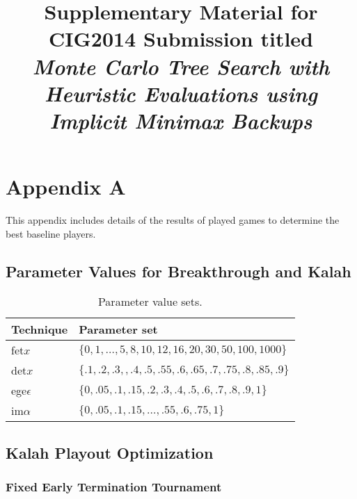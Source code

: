 \documentclass{article}
\title{Supplementary Material for CIG2014 Submission titled\\{\it Monte Carlo Tree Search with Heuristic Evaluations using Implicit Minimax Backups}}
\author{}
\date{}
\begin{document}
\maketitle %

\section{Appendix A}

This appendix includes details of the results of played games to determine the best baseline players. 

\subsection{Parameter Values for Breakthrough and Kalah}

\begin{table}[h!]
\begin{center}
\begin{tabular}{|l|l|}
\hline
Technique & Parameter set \\
\hline
fet$x$          & $\{ 0, 1, \ldots, 5, 8, 10, 12, 16, 20, 30, 50, 100, 1000 \}$ \\
det$x$         & $\{ .1, .2, .3, , .4, .5, .55, .6, .65, .7, .75, .8, .85, .9 \}$ \\
ege$\epsilon$  & $\{ 0, .05, .1, .15, .2, .3, .4, .5, .6, .7, .8, .9, 1 \}$ \\
im$\alpha$     & $\{ 0, .05, .1, .15, \ldots, .55, .6, .75, 1 \}$ \\
\hline
\end{tabular}
\end{center}
\caption{Parameter value sets.}
\label{tbl:parmsets}
\end{table}

\subsection{Kalah Playout Optimization}

\subsubsection{Fixed Early Termination Tournament}
\end{document}
